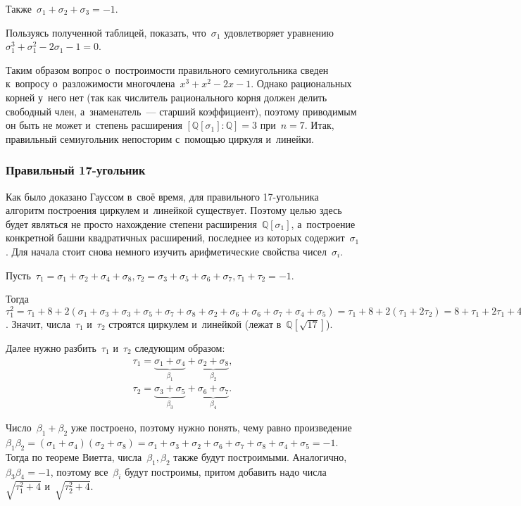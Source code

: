 \documentclass{article}
\begin{document}
Также~$\sigma_1 + \sigma_2 + \sigma_3 = -1$.

\begin{exercise}
  Пользуясь полученной таблицей, показать, что~$\sigma_1$ удовлетворяет
  уравнению~$\sigma_1^3 + \sigma_1^2 - 2\sigma_1 - 1 = 0$.
\end{exercise}

Таким образом вопрос о~построимости правильного семиугольника сведен
к~вопросу о~разложимости многочлена~$x^3 + x^2 - 2x - 1$. Однако рациональных
корней у~него нет (так как числитель рационального корня должен делить свободный
член, а~знаменатель~--- старший коэффициент), поэтому приводимым он быть не
может и~степень расширения $[\mathbb{Q}[\sigma_1]:\mathbb{Q}] = 3$ при~$n = 7$.
Итак, правильный семиугольник непосторим с~помощью циркуля и~линейки.

\subsubsection{Правильный 17-угольник}

Как было доказано Гауссом в~своё время, для правильного 17-угольника алгоритм
построения циркулем и~линейкой существует. Поэтому целью здесь будет являться не
просто нахождение степени расширения~$\mathbb{Q}[\sigma_1]$, а~построение
конкретной башни квадратичных расширений, последнее из которых
содержит~$\sigma_1$. Для начала стоит снова немного изучить арифметические
свойства чисел~$\sigma_i$.

Пусть~$\tau_1 = \sigma_1 + \sigma_2 + \sigma_4 + \sigma_8, \tau_2 = \sigma_3 +
\sigma_5 + \sigma_6 + \sigma_7, \tau_1 + \tau_2 = -1$.

Тогда~$\tau_1^2 = \tau_1 + 8 + 2(\sigma_1 + \sigma_3 + \sigma_3 + \sigma_5 +
\sigma_7 + \sigma_8 + \sigma_2 + \sigma_6 + \sigma_6 + \sigma_7 + \sigma_4 +
\sigma_5) = \tau_1 + 8 + 2(\tau_1 + 2\tau_2) = 8 + \tau_1 + 2\tau_1 + 4(-1 -
\tau_1) = 4 - \tau_1$. Значит, числа~$\tau_1$ и~$\tau_2$ строятся циркулем
и~линейкой (лежат в~$\mathbb{Q}[\sqrt{17}]$).

Далее нужно разбить~$\tau_1$ и~$\tau_2$ следующим образом:
\begin{gather*}
  \tau_1 = \underbrace{\sigma_1 + \sigma_4}_{\beta_1} + \underbrace{\sigma_2 +
  \sigma_8}_{\beta_2},\\
  \tau_2 = \underbrace{\sigma_3 + \sigma_5}_{\beta_3} + \underbrace{\sigma_6 +
  \sigma_7}_{\beta_4}.
\end{gather*}

Число~$\beta_1 + \beta_2$ уже построено, поэтому нужно понять, чему равно
произведение~$\beta_1 \beta_2 = (\sigma_1 + \sigma_4)(\sigma_2 + \sigma_8) =
\sigma_1 + \sigma_3 + \sigma_2 + \sigma_6 + \sigma_7 + \sigma_8 + \sigma_4 +
\sigma_5 = -1$. Тогда по теореме Виетта, числа~$\beta_1, \beta_2$ также будут
построимыми. Аналогично, $\beta_3 \beta_4 = -1$, поэтому все~$\beta_i$ будут
построимы, притом добавить надо числа $\sqrt{\tau_1^2 + 4}$ и~$\sqrt{\tau_2^2 +
4}$.
\end{document}
